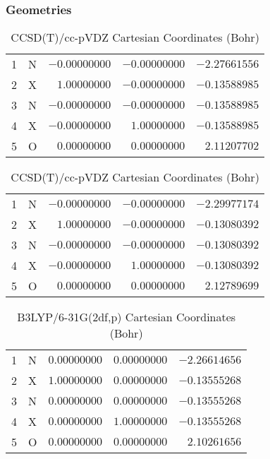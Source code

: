 \documentclass[10pt,oneside]{article}
\begin{document}
\begin{table}[h!]
\subsubsection*{Geometries}
\begin{multicols}{2}
\centering
\caption{CCSD(T)/cc-pVTZ Cartesian Coordinates (Bohr)}
\begin{tabular}{llrrr}
\toprule
1  & N  & $-0.00000000$ & $-0.00000000$ & $-2.27661556$ \\
2  & X  & $ 1.00000000$ & $-0.00000000$ & $-0.13588985$ \\
3  & N  & $-0.00000000$ & $-0.00000000$ & $-0.13588985$ \\
4  & X  & $-0.00000000$ & $ 1.00000000$ & $-0.13588985$ \\
5  & O  & $ 0.00000000$ & $ 0.00000000$ & $ 2.11207702$ \\
\bottomrule
\end{tabular}
\caption{CCSD(T)/cc-pVDZ Cartesian Coordinates (Bohr)}
\begin{tabular}{llrrr}
\toprule
1  & N  & $-0.00000000$ & $-0.00000000$ & $-2.29977174$ \\
2  & X  & $ 1.00000000$ & $-0.00000000$ & $-0.13080392$ \\
3  & N  & $-0.00000000$ & $-0.00000000$ & $-0.13080392$ \\
4  & X  & $-0.00000000$ & $ 1.00000000$ & $-0.13080392$ \\
5  & O  & $ 0.00000000$ & $ 0.00000000$ & $ 2.12789699$ \\
\bottomrule
\end{tabular}
\end{multicols}
\end{table}

\begin{table}[h]
\centering
\caption{B3LYP/6-31G(2df,p) Cartesian Coordinates (Bohr)}
\begin{tabular}{llrrr}
\toprule
1  & N  & $ 0.00000000$ & $ 0.00000000$ & $-2.26614656$ \\
2  & X  & $ 1.00000000$ & $ 0.00000000$ & $-0.13555268$ \\
3  & N  & $ 0.00000000$ & $ 0.00000000$ & $-0.13555268$ \\
4  & X  & $ 0.00000000$ & $ 1.00000000$ & $-0.13555268$ \\
5  & O  & $ 0.00000000$ & $ 0.00000000$ & $ 2.10261656$ \\
\bottomrule
\end{tabular}
\end{table}
\end{document}
